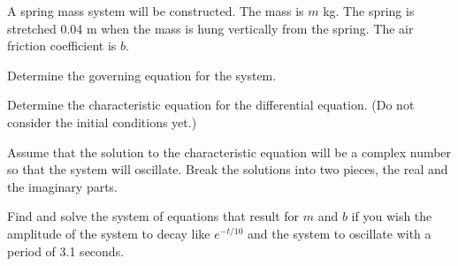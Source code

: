 \begin{problem}
\item A spring mass system will be constructed. The mass is $m$
  kg. The spring is stretched 0.04 m when the mass is hung vertically
  from the spring. The air friction coefficient is $b$.

    \begin{subproblem}
      \item Determine the governing equation for the system. 
        \vfill

      \item Determine the characteristic equation for the differential
        equation. (Do not consider the initial conditions yet.)
        \vfill

        \clearpage

      \item Assume that the solution to the characteristic equation
        will be a complex number so that the system will
        oscillate. Break the solutions into two pieces, the real and
        the imaginary parts.

        \vfill

      \item Find and solve the system of equations that result for $m$
        and $b$ if you wish the amplitude of the system to decay like
        $e^{-t/10}$ and the system to oscillate with a period of 3.1
        seconds.

        \vfill

    \end{subproblem}


\end{problem}




